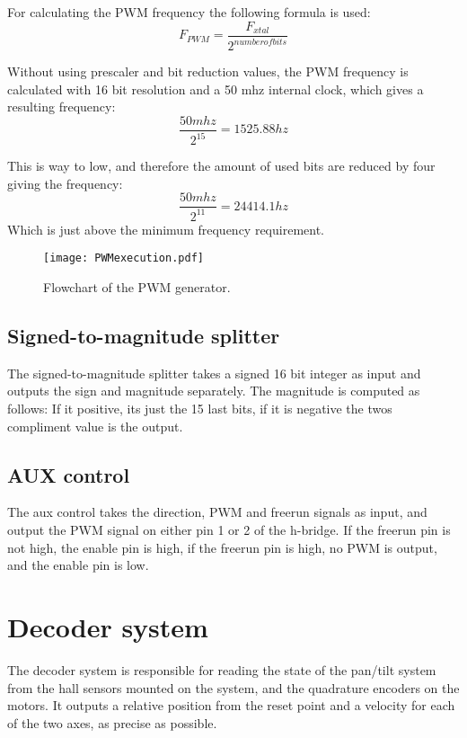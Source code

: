 For calculating the PWM frequency the following formula is used: 
\begin{equation}
F_{PWM} = \frac{F_{xtal}}{2^{number of bits}}
\end{equation}

Without using prescaler and bit reduction values, the PWM frequency is calculated with 16 bit resolution and a 50 mhz internal clock, which gives a resulting frequency:
\begin{equation}
\frac{50 mhz}{2^{15}} = 1525.88 hz
\end{equation}

This is way to low, and therefore the amount of used bits are reduced by four giving the frequency:
\begin{equation}
\frac{50 mhz}{2^{11}} = 24414.1 hz
\end{equation}
Which is just above the minimum frequency requirement.

\begin{figure}[htb]
\centering
\texttt{[image: PWMexecution.pdf]}
\caption{Flowchart of the PWM generator.}
\label{fig:PWMchart}
\end{figure}

\subsection{Signed-to-magnitude splitter}
The signed-to-magnitude splitter takes a signed 16 bit integer as input and outputs the sign and magnitude separately.
The magnitude is computed as follows:
If it positive, its just the 15 last bits, if it is negative the twos compliment value is the output.

\subsection{AUX control}
The aux control takes the direction, PWM and freerun signals as input, and output the PWM signal on either pin 1 or 2 of the h-bridge. If the freerun pin is not high, the enable pin is high, if the freerun pin is high, no PWM is output, and the enable pin is low.

\section{Decoder system}
The decoder system is responsible for reading the state of the pan/tilt system from the hall sensors mounted on the system, and the quadrature encoders on the motors. 
It outputs a relative position from the reset point and a velocity for each of the two axes, as precise as possible.

